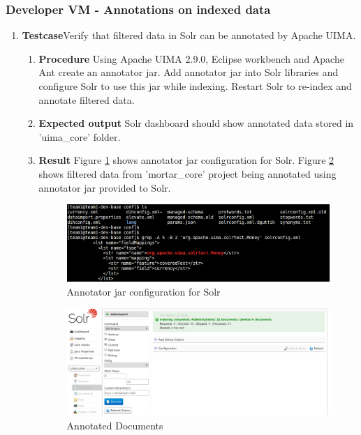 \subsubsection{Developer VM - Annotations on indexed data}
\begin{enumerate}
\item \textbf{Testcase}\newline Verify that filtered data in Solr can
  be annotated by Apache UIMA.
  \begin{enumerate}[label={}]
  \item \textbf{Procedure}\newline
    Using Apache UIMA 2.9.0, Eclipse workbench and Apache Ant create
    an annotator jar. Add annotator jar into Solr libraries and
    configure Solr to use this jar while indexing. Restart Solr to
    re-index and annotate filtered data.
  \item \textbf{Expected output}\newline
    Solr dashboard should show annotated data stored in 'uima\_core' folder.
  \item \textbf{Result}\newline
    Figure \ref{uima-annotator} shows annotator jar configuration for Solr.
    Figure \ref{uima-core} shows filtered data from 'mortar\_core'
    project being annotated using annotator jar provided to Solr.
    \begin{figure}
      \centering
      \includegraphics[scale=0.4]{screenshots/uima-annotator.png}
      \caption{Annotator jar configuration for Solr}
      \label{uima-annotator}
    \end{figure}
    \begin{figure}
      \centering
      \includegraphics[scale=0.27]{screenshots/uima-core.png}
      \caption{Annotated Documents}
      \label{uima-core}
    \end{figure}
  \end{enumerate}
\end{enumerate}


